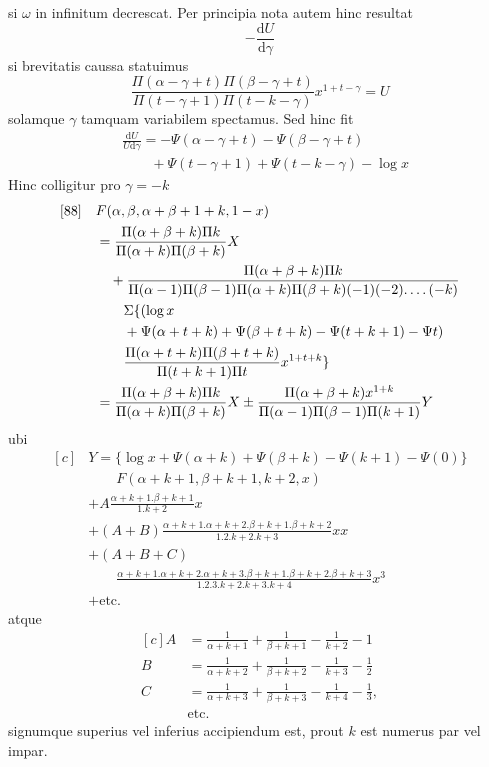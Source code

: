 si $\omega$ in infinitum decrescat. Per principia nota autem hinc resultat
\[
-\frac{\mathrm{d}U}{\mathrm{d}\gamma}
\]
si brevitatis caussa statuimus
\[
\frac{\Pi(\alpha-\gamma+t)\Pi(\beta-\gamma+t)}{\Pi(t-\gamma+1)\Pi(t-k-\gamma)}x^{1+t-\gamma}=U
\]
solamque $\gamma$ tamquam variabilem spectamus. Sed hinc fit
\[
\begin{aligned}&\frac{\mathrm{d}U}{U\mathrm{d}\gamma}
=-\Psi(\alpha-\gamma+t)-\Psi(\beta-\gamma+t)\\&\qquad+\Psi(t-\gamma+1)+\Psi(t-k-\gamma)-\log x\end{aligned}
\]
Hinc colligitur pro $\gamma=-k$
\[
\begin{aligned}[c]
[88]\quad &F(\alpha,\beta,\alpha+\beta+1+k,1-x)\\
&=\frac{\Pi(\alpha+\beta+k)\Pi k}{\Pi(\alpha+k)\Pi(\beta+k)}X\\
&\quad+\frac{\Pi(\alpha+\beta+k)\Pi k}{\Pi(\alpha-1)\Pi(\beta-1)\Pi(\alpha+k)\Pi(\beta+k)(-1)(-2)\ldotp\ldotp\ldotp\ldotp(-k)}\\&\qquad\Sigma\{(\log x\\
&\qquad+\Psi(\alpha+t+k)+\Psi(\beta+t+k)-\Psi(t+k+1)-\Psi t)
\\&\qquad\frac{\Pi(\alpha+t+k)\Pi(\beta+t+k)}{\Pi(t+k+1)\Pi t}x^{1+t+k}\}\\
&=\frac{\Pi(\alpha+\beta+k)\Pi k}{\Pi(\alpha+k)\Pi(\beta+k)}X
\pm\frac{\Pi(\alpha+\beta+k)x^{1+k}}{\Pi(\alpha-1)\Pi(\beta-1)\Pi(k+1)}Y
\end{aligned}
\]
ubi
\[
\begin{aligned}[c]
&Y=\{\log x+\Psi(\alpha+k)+\Psi(\beta+k)-\Psi(k+1)-\Psi(0)\}\\&\qquad F(\alpha+k+1,\beta+k+1,k+2,x)\\
&+A\frac{\alpha+k+1.\beta+k+1}{1. k+2}x\\
&+(A+B)\frac{\alpha+k+1.\alpha+k+2.\beta+k+1.\beta+k+2}{1.2. k+2. k+3}xx\\
&+(A+B+C)\\&\qquad\frac{\alpha+k+1.\alpha+k+2.\alpha+k+3.\beta+k+1.\beta+k+2.\beta+k+3}{1.2.3. k+2. k+3. k+4}x^3\\
&+\text{etc.}
\end{aligned}
\]
atque
\[
\begin{aligned}[c]
A&=\frac{1}{\alpha+k+1}+\frac{1}{\beta+k+1}-\frac{1}{k+2}-1\\
B&=\frac{1}{\alpha+k+2}+\frac{1}{\beta+k+2}-\frac{1}{k+3}-\frac12\\
C&=\frac{1}{\alpha+k+3}+\frac{1}{\beta+k+3}-\frac{1}{k+4}-\frac13,\\
&\text{etc.}
\end{aligned}
\]
signumque superius vel inferius accipiendum est, prout $k$ est numerus par vel
impar.

